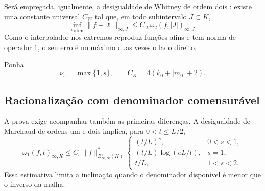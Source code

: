 Será empregada, igualmente, a desigualdade de Whitney de ordem dois
\citep{artigo_2-whitney1957,artigo_1-devore1998}: existe uma
constante universal $C_W$ tal que, em todo subintervalo $J\subset K$,
\begin{equation}
 \inf_{\ell\ \text{afim}}\|f-\ell\|_{\infty,J}
 \le C_W\omega_2(f,|J|)_{\infty,J}.
 \label{artigo_3:eq:whitney-direct}
\end{equation}
Como o interpolador nos extremos reproduz funções afins e tem norma de
operador $1$, o seu erro é no máximo duas vezes o lado direito.

Ponha
\begin{equation}
 \nu_s=\max\{1,s\},
 \qquad C_K=4(k_0+|m_0|+2).
 \label{artigo_3:eq:height-schedule-constants}
\end{equation}

\subsection{Racionalização com denominador comensurável}

A prova exige acompanhar também as primeiras diferenças. A desigualdade de
Marchaud de ordens um e dois
\citep{artigo_2-devorelorentz1993,artigo_1-lorentz1996} implica, para $0<t\le L/2$,
\begin{equation}
 \omega_1(f,t)_{\infty,K}
 \le C_s\|f\|_{B^s_{\infty,\infty}(K)}^*
 \begin{cases}
  (t/L)^s,&0<s<1,\\
  (t/L)\log(eL/t),&s=1,\\
  t/L,&1<s<2.
 \end{cases}
 \label{artigo_3:eq:marchaud-regimes}
\end{equation}
Essa estimativa limita a inclinação quando
o denominador disponível é menor que o inverso da malha.

